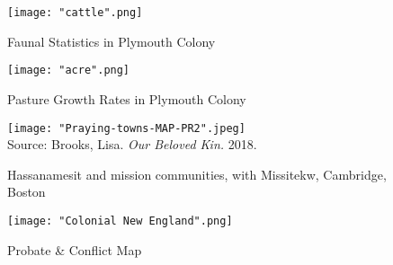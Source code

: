 \documentclass[11pt]{article}
\begin{document}
\begin{landscape}

\begin{figure}
\caption{Faunal Statistics in Plymouth Colony}
  \texttt{[image: "cattle".png]} 
\end{figure}

\begin{figure}
\caption{Pasture Growth Rates in Plymouth Colony}
  \texttt{[image: "acre".png]} 
\end{figure}

\begin{figure}
\caption{Hassanamesit and mission communities, with Missitekw, Cambridge, Boston}
  \texttt{[image: "Praying-towns-MAP-PR2".jpeg]} \\
Source: Brooks, Lisa. {\em Our Beloved Kin.} 2018.
\end{figure}

\begin{figure}
\caption{Probate \& Conflict Map}
  \texttt{[image: "Colonial New England".png]} \\

\end{figure}

\end{landscape}


\end{document}
